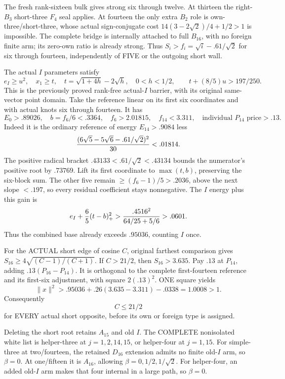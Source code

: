 The fresh rank-sixteen bulk gives strong
six through twelve.
At thirteen the right-\(B_3\) short-three
\(F_4\) seal applies.
At fourteen the only extra \(B_2\)
role is own-three/short-three, whose
actual sign-conjugate cost
\(14(3-2\sqrt2)/4+1/2>1\) is impossible.
The complete bridge is internally attached
to full \(B_{16}\), with no foreign
finite arm; its zero-own ratio is already
strong.
Thus \(S_i>f_i=\sqrt i-.61/\sqrt2\)
for six through fourteen, independently
of FIVE or the outgoing short wall.

The actual \(I\) parameters satisfy
\[
 e_I\ge u^2,\quad x_1\ge t,\quad
 t=\sqrt{1+4h}-2\sqrt h,\quad0<h<1/2,\qquad
                        t+(8/5)u>197/250 .
\]
This is the previously proved rank-free
actual-\(I\) barrier, with its original
same-vector point domain.
Take the reference linear on its first
six coordinates and with actual knots
six through fourteen.
It has
\[
 E_0>.89026,\quad b=f_6/6<.3364,\quad
 f_6>2.01815,\quad f_{14}<3.311,\quad
                   \text{individual }P_{14}\text{ price}>.13 .
\]
Indeed it is the ordinary reference of
energy \(E_{14}>.9084\) less
\[
               { (6\sqrt5-5\sqrt6-.61/\sqrt2)^2\over30}<.01814 .
\]
The positive radical bracket
\(.43133<.61/\sqrt2<.43134\)
bounds the numerator's positive root by
\(.73769\).
Lift its first coordinate to \(\max(t,b)\),
preserving the six-block sum.
The other five remain
\(\ge(f_6-1)/5>.2036\), above the next
slope \(<.197\), so every residual
coefficient stays nonnegative.
The \(I\) energy plus this gain is
\[
       e_I+{6\over5}(t-b)_+^2
          >{.4516^2\over64/25+5/6}>.0601 .
\]
Thus the combined base already exceeds
\(.95036\), counting \(I\) once.

For the ACTUAL short edge of cosine \(C\),
original farthest comparison gives
\(S_{16}\ge4\sqrt{(C-1)/(C+1)}\).
If \(C>21/2\), then \(S_{16}>3.635\).
Pay \(.13\) at \(P_{14}\), adding
\(.13(P_{16}-P_{14})\).
It is orthogonal to the complete first-fourteen
reference and its first-six adjustment,
with square \(2(.13)^2\).
ONE square yields
\[
                \|x\|^2>.95036+.26(3.635-3.311)-.0338
                            =1.0008>1 .
\]
Consequently
\[
                                    C\le21/2
\tag{B16Icut}\label{eq:arithB16Ishortcut}
\]
for EVERY actual short opposite, before
its own or foreign type is assigned.

Deleting the short root retains \(A_{15}\)
and old \(I\).
The COMPLETE nonisolated white list is
helper-three at \(j=1,2,14,15\), or
helper-four at \(j=1,15\).
For simple-three at two/fourteen,
the retained \(D_{16}\) extension admits
no finite old-\(I\) arm, so \(\beta=0\).
At one/fifteen it is \(A_{16}\), allowing
\(\beta=0,1/2,1/\sqrt2\).
For helper-four, an added old-\(I\) arm
makes that four internal in a large path,
so \(\beta=0\).

